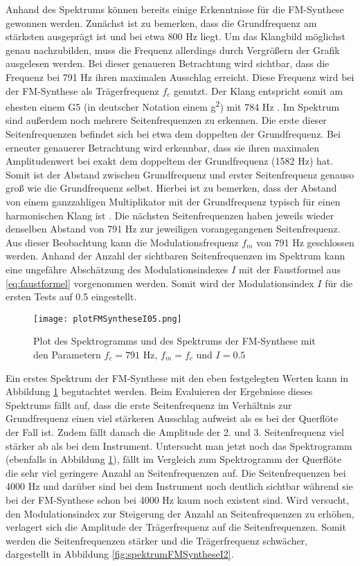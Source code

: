 Anhand des Spektrums können bereits einige Erkenntnisse für die FM-Synthese gewonnen werden. Zunächst ist zu bemerken, dass die Grundfrequenz am stärksten ausgeprägt ist und bei etwa 800 Hz liegt. Um das Klangbild möglichst genau nachzubilden, muss die Frequenz allerdings durch Vergrößern der Grafik ausgelesen werden. Bei dieser genaueren Betrachtung wird sichtbar, dass die Frequenz bei 791 Hz ihren maximalen Ausschlag erreicht. Diese Frequenz wird bei der FM-Synthese als Trägerfrequenz $f_c$ genutzt. Der Klang entspricht somit am ehesten einem G5 (in deutscher Notation einem g\textsuperscript{2}) mit 784 Hz \cite[S. 181]{borucki}. Im Spektrum sind außerdem noch mehrere Seitenfrequenzen zu erkennen. Die erste dieser Seitenfrequenzen befindet sich bei etwa dem doppelten der Grundfrequenz. Bei erneuter genauerer Betrachtung wird erkennbar, dass sie ihren maximalen Amplitudenwert bei exakt dem doppeltem der Grundfrequenz (1582 Hz) hat. Somit ist der Abstand zwischen Grundfrequenz und erster Seitenfrequenz genauso groß wie die Grundfrequenz selbst. Hierbei ist zu bemerken, dass der Abstand von einem ganzzahligen Multiplikator mit der Grundfrequenz typisch für einen harmonischen Klang ist \cite[S. 528]{chowningPaper}. Die nächsten Seitenfrequenzen haben jeweils wieder denselben Abstand von 791 Hz zur jeweiligen vorangegangenen Seitenfrequenz. Aus dieser Beobachtung kann die Modulationsfrequenz $f_m$ von 791 Hz geschlossen werden. Anhand der Anzahl der sichtbaren Seitenfrequenzen im Spektrum kann eine ungefähre Abschätzung des Modulationsindexes $I$ mit der Faustformel aus \ref{eq:faustformel} vorgenommen werden. Somit wird der Modulationsindex $I$ für die ersten Tests auf 0.5 eingestellt. 

\begin{figure} [ht]
\centering
  \texttt{[image: plotFMSyntheseI05.png]}
\caption{Plot des Spektrogramms und des Spektrums der FM-Synthese mit den Parametern $f_c = 791$ Hz, $f_m = f_c$ und $I = 0.5$ }
\label{fig:plotFMSyntheseI05}
\end{figure}

Ein erstes Spektrum der FM-Synthese mit den eben festgelegten Werten kann in Abbildung \ref{fig:plotFMSyntheseI05} begutachtet werden. Beim Evaluieren der Ergebnisse dieses Spektrums fällt auf, dass die erste Seitenfrequenz im Verhältnis zur Grundfrequenz einen viel stärkeren Ausschlag aufweist als es bei der Querflöte der Fall ist. Zudem fällt danach die Amplitude der 2. und 3. Seitenfrequenz viel stärker ab als bei dem Instrument. Untersucht man jetzt noch das Spektrogramm (ebenfalls in Abbildung \ref{fig:plotFMSyntheseI05}), fällt im Vergleich zum Spektrogramm der Querflöte die sehr viel geringere Anzahl an Seitenfrequenzen auf. Die Seitenfrequenzen bei 4000 Hz und darüber sind bei dem Instrument noch deutlich sichtbar während sie bei der FM-Synthese schon bei 4000 Hz kaum noch existent sind. Wird versucht, den Modulationsindex zur Steigerung der Anzahl an Seitenfrequenzen zu erhöhen, verlagert sich die Amplitude der Trägerfrequenz auf die Seitenfrequenzen. Somit werden die Seitenfrequenzen stärker und die Trägerfrequenz schwächer, dargestellt in Abbildung \ref{fig:spektrumFMSyntheseI2}. 

